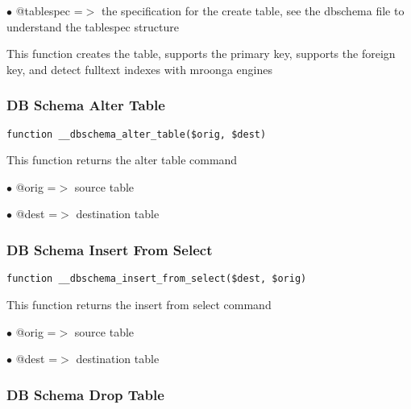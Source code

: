 \documentclass[a4paper]{article}
\begin{document}
\begin{compactitem}
\item[\color{myblue}$\bullet$] @tablespec =$>$ the specification for the create table, see the dbschema
              file to understand the tablespec structure
\end{compactitem}

This function creates the table, supports the primary key, supports the
foreign key, and detect fulltext indexes with mroonga engines

\hypertarget{toc431}{}
\subsubsection{DB Schema Alter Table}

\begin{lstlisting}
function __dbschema_alter_table($orig, $dest)
\end{lstlisting}

This function returns the alter table command

\begin{compactitem}
\item[\color{myblue}$\bullet$] @orig =$>$ source table
\item[\color{myblue}$\bullet$] @dest =$>$ destination table
\end{compactitem}

\hypertarget{toc432}{}
\subsubsection{DB Schema Insert From Select}

\begin{lstlisting}
function __dbschema_insert_from_select($dest, $orig)
\end{lstlisting}

This function returns the insert from select command

\begin{compactitem}
\item[\color{myblue}$\bullet$] @orig =$>$ source table
\item[\color{myblue}$\bullet$] @dest =$>$ destination table
\end{compactitem}

\hypertarget{toc433}{}
\subsubsection{DB Schema Drop Table}
\end{document}
